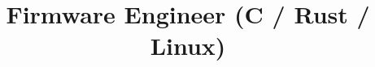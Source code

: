 \documentclass[11pt,a4paper,sans]{moderncv}
\title{Firmware Engineer (C / Rust / Linux)}
\begin{document}
\makecvtitle









% 
\end{document}
